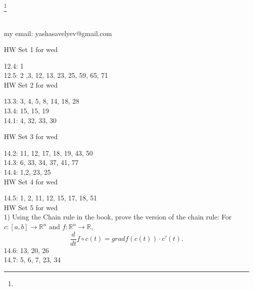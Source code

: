 \documentclass{amsart}
\numberwithin{equation}{section}
\theoremstyle{definition}
\theoremstyle{remark}
\begin{document}
\title{}
\author{Yasha Savelyev}
\thanks {}
\address{University of Colima, CUICBAS}
\keywords{}
\begin{abstract}   
\end{abstract}
\maketitle
\section{}
my email: yashasavelyev@gmail.com

HW Set 1 for wed

12.4: 1  \\
12.5: 2 ,3, 12, 13, 23, 25, 59, 65, 71  \\

HW Set 2 for wed

13.3: 3, 4, 5, 8, 14, 18, 28  \\
13.4: 15, 15, 19 \\
14.1: 4, 32, 33, 30

HW Set 3 for wed

14.2: 11, 12, 17, 18, 19, 43, 50 \\
14.3: 6, 33, 34, 37, 41, 77 \\
14.4: 1,2, 23, 25 \\

HW Set 4 for wed

14.5: 1, 2, 11, 12, 15, 17, 18, 51 \\

HW Set 5 for wed \\

1) Using the Chain rule in the book, prove the version of the chain rule:
For $c: [a,b] \to \mathbb{R} ^{n}$ and $f: \mathbb{R} ^{n}
\to \mathbb{R}$, $$\frac{d}{dt} f \circ c (t)  = grad f (c (t)
) \cdot c' (t).$$ 
14.6: 13, 20, 26 \\
14.7: 5, 6, 7, 23, 34 \\
\end{document}
